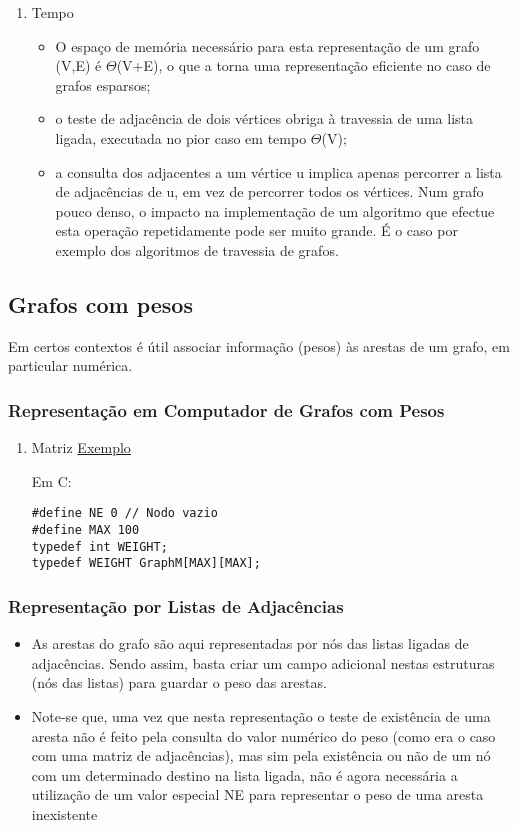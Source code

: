 \documentclass[11pt]{article}
\begin{document}
\begin{enumerate}
\item Tempo
\label{sec:org4b3c5c8}
\begin{itemize}
\item O espaço de memória necessário para esta representação de um grafo (V,E)  é  \(\Theta\)(V+E), o que a torna uma representação eficiente no caso de grafos esparsos;
\item o teste de adjacência de dois vértices obriga à travessia de uma lista ligada, executada no pior caso em tempo \(\Theta\)(V);
\item a consulta dos adjacentes a um vértice u implica apenas percorrer a lista de adjacências de u, em vez de percorrer todos os vértices. Num grafo pouco denso, o impacto na implementação de um algoritmo que efectue esta operação repetidamente pode ser muito grande. É o caso por exemplo dos algoritmos de travessia de grafos.
\end{itemize}
\end{enumerate}

\subsection{Grafos com pesos}
\label{sec:org633bfdc}
Em certos contextos é útil associar informação (pesos) às arestas de um grafo, em particular numérica.
\subsubsection{Representação em Computador de Grafos com Pesos}
\label{sec:org416aa74}
\begin{enumerate}
\item Matriz
\label{sec:org12c4f32}
\href{./peso\_grafo.png}{Exemplo}

Em C:
\begin{verbatim}
#define NE 0 // Nodo vazio
#define MAX 100
typedef int WEIGHT;
typedef WEIGHT GraphM[MAX][MAX];
\end{verbatim}
\end{enumerate}
\subsubsection{Representação por Listas de Adjacências}
\label{sec:orga915417}
\begin{itemize}
\item As arestas do grafo são aqui representadas por nós das listas ligadas de adjacências. Sendo assim, basta criar um campo adicional nestas estruturas (nós das listas) para guardar o peso das arestas.

\item Note-se que, uma vez que nesta representação o teste de existência de uma aresta não é feito pela consulta do valor numérico do peso (como era o caso com uma matriz de adjacências), mas sim pela existência ou não de um nó com um determinado destino na lista ligada, não é agora necessária a utilização de um valor especial NE para representar o peso de uma aresta inexistente
\end{itemize}
\end{document}
